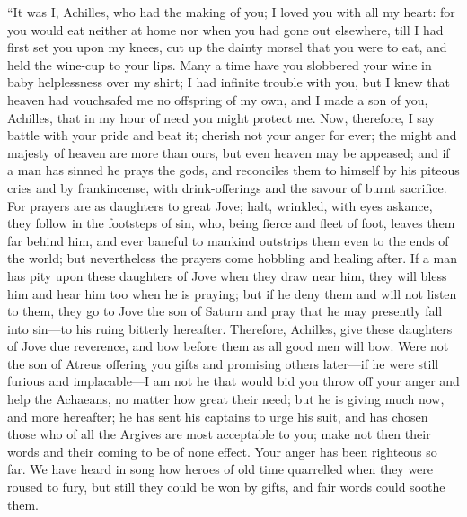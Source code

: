 “It was I, Achilles, who had the making of you; I loved you with all my
heart: for you would eat neither at home nor when you had gone out
elsewhere, till I had first set you upon my knees, cut up the dainty
morsel that you were to eat, and held the wine-cup to your lips. Many a
time have you slobbered your wine in baby helplessness over my shirt; I
had infinite trouble with you, but I knew that heaven had vouchsafed me no
offspring of my own, and I made a son of you, Achilles, that in my hour of
need you might protect me. Now, therefore, I say battle with your pride
and beat it; cherish not your anger for ever; the might and majesty of
heaven are more than ours, but even heaven may be appeased; and if a man
has sinned he prays the gods, and reconciles them to himself by his
piteous cries and by frankincense, with drink-offerings and the savour of
burnt sacrifice. For prayers are as daughters to great Jove; halt,
wrinkled, with eyes askance, they follow in the footsteps of sin, who,
being fierce and fleet of foot, leaves them far behind him, and ever
baneful to mankind outstrips them even to the ends of the world; but
nevertheless the prayers come hobbling and healing after. If a man has
pity upon these daughters of Jove when they draw near him, they will bless
him and hear him too when he is praying; but if he deny them and will not
listen to them, they go to Jove the son of Saturn and pray that he may
presently fall into sin—to his ruing bitterly hereafter. Therefore,
Achilles, give these daughters of Jove due reverence, and bow before them
as all good men will bow. Were not the son of Atreus offering you gifts
and promising others later—if he were still furious and implacable—I
am not he that would bid you throw off your anger and help the Achaeans,
no matter how great their need; but he is giving much now, and more
hereafter; he has sent his captains to urge his suit, and has chosen those
who of all the Argives are most acceptable to you; make not then their
words and their coming to be of none effect. Your anger has been righteous
so far. We have heard in song how heroes of old time quarrelled when they
were roused to fury, but still they could be won by gifts, and fair words
could soothe them.

